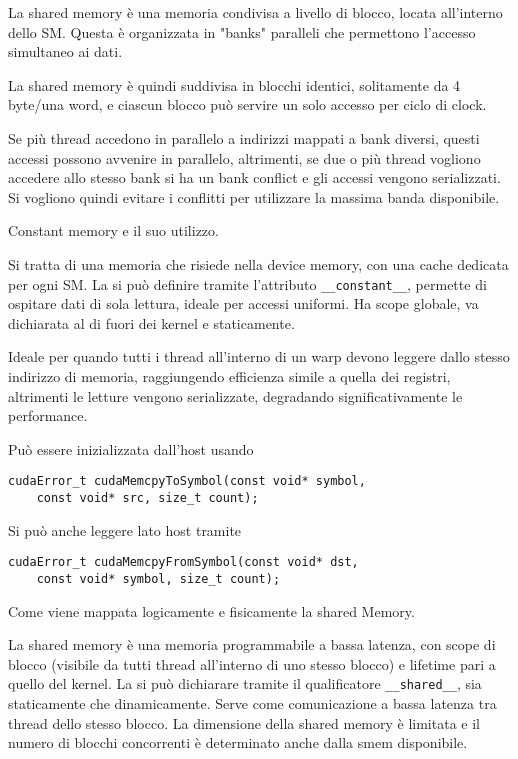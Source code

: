 \begin{questions}
    \begin{solution}
        La shared memory è una memoria condivisa a livello di blocco, locata all'interno dello SM. Questa è organizzata in "banks" paralleli che permettono l'accesso simultaneo ai dati.
        
        La shared memory è quindi suddivisa in blocchi identici, solitamente da 4 byte/una word, e ciascun blocco può servire un solo accesso per ciclo di clock. 
        
        Se più thread accedono in parallelo a indirizzi mappati a bank diversi, questi accessi possono avvenire in parallelo, altrimenti, se due o più thread vogliono accedere allo stesso bank si ha un bank conflict e gli accessi vengono serializzati. Si vogliono quindi evitare i conflitti per utilizzare la massima banda disponibile.
    \end{solution}
    
    \question Constant memory e il suo utilizzo.
    
    \begin{solution}
        Si tratta di una memoria che risiede nella device memory, con una cache dedicata per ogni SM. La si può definire tramite l'attributo \texttt{\_\_constant\_\_}, permette di ospitare dati di sola lettura, ideale per accessi uniformi. Ha scope globale, va dichiarata al di fuori dei kernel e staticamente.
        
        Ideale per quando tutti i thread all'interno di un warp devono leggere dallo stesso indirizzo di memoria, raggiungendo efficienza simile a quella dei registri, altrimenti le letture vengono serializzate, degradando significativamente le performance.
        
        Può essere inizializzata dall'host usando
        \begin{verbatim}
cudaError_t cudaMemcpyToSymbol(const void* symbol,
    const void* src, size_t count);
        \end{verbatim}
        Si può anche leggere lato host tramite
        \begin{verbatim}
cudaError_t cudaMemcpyFromSymbol(const void* dst, 
    const void* symbol, size_t count);
        \end{verbatim}
    \end{solution}
    
    \question Come viene mappata logicamente e fisicamente la shared Memory.
    
    \begin{solution}
        La shared memory è una memoria programmabile a bassa latenza, con scope di blocco (visibile da tutti thread all'interno di uno stesso blocco) e lifetime pari a quello del kernel. La si può dichiarare tramite il qualificatore \texttt{\_\_shared\_\_}, sia staticamente che dinamicamente. Serve come comunicazione a bassa latenza tra thread dello stesso blocco. La dimensione della shared memory è limitata e il numero di blocchi concorrenti è determinato anche dalla smem disponibile.
        

\end{solution}
\end{questions}
